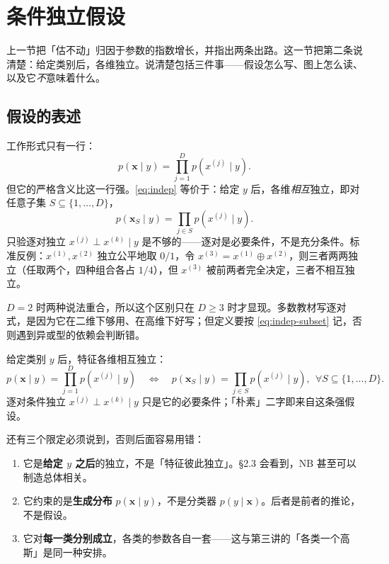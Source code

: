 \documentclass[11pt,a4paper,fontset=windows,zihao=-4]{ctexart}
\newcommand{\bx}{\mathbf{x}}
\begin{document}

\section{条件独立假设}

上一节把「估不动」归因于参数的指数增长，并指出两条出路。这一节把第二条说清楚：给定类别后，各维独立。说清楚包括三件事——假设怎么写、图上怎么读、以及它\emph{不}意味着什么。

\subsection{假设的表述}

工作形式只有一行：
\begin{equation}
  p(\bx\mid y)=\prod_{j=1}^{D}p(x^{(j)}\mid y).
  \label{eq:indep}
\end{equation}
但它的严格含义比这一行强。\eqref{eq:indep} 等价于：给定 $y$ 后，各维\emph{相互}独立，即对任意子集 $S\subseteq\{1,\dots,D\}$，
\begin{equation}
  p(\bx_S\mid y)=\prod_{j\in S}p(x^{(j)}\mid y).
  \label{eq:indep-subset}
\end{equation}
只验逐对独立 $x^{(j)}\perp x^{(k)}\mid y$ 是不够的——逐对是必要条件，不是充分条件。标准反例：$x^{(1)},x^{(2)}$ 独立公平地取 $0/1$，令 $x^{(3)}=x^{(1)}\oplus x^{(2)}$，则三者两两独立（任取两个，四种组合各占 $1/4$），但 $x^{(3)}$ 被前两者完全决定，三者不相互独立。

$D=2$ 时两种说法重合，所以这个区别只在 $D\ge3$ 时才显现。多数教材写逐对式，是因为它在二维下够用、在高维下好写；但定义要按 \eqref{eq:indep-subset} 记，否则遇到异或型的依赖会判断错。

\begin{dfn}[条件独立假设]
给定类别 $y$ 后，特征各维相互独立：
\[
  p(\bx\mid y)=\prod_{j=1}^{D}p(x^{(j)}\mid y)
  \quad\Longleftrightarrow\quad
  p(\bx_S\mid y)=\prod_{j\in S}p(x^{(j)}\mid y),\ \ \forall S\subseteq\{1,\dots,D\}.
\]
逐对条件独立 $x^{(j)}\perp x^{(k)}\mid y$ 只是它的必要条件；「朴素」二字即来自这条强假设。
\end{dfn}

还有三个限定必须说到，否则后面容易用错：

\begin{enumerate}[label=\textcolor{navy}{\bfseries(\arabic*)},leftmargin=2.4em]
  \item 它是\textbf{给定 $y$ 之后}的独立，不是「特征彼此独立」。§2.3 会看到，NB 甚至可以制造总体相关。
  \item 它约束的是\textbf{生成分布} $p(\bx\mid y)$，不是分类器 $p(y\mid\bx)$。后者是前者的推论，不是假设。
  \item 它对\textbf{每一类分别成立}，各类的参数各自一套——这与第三讲的「各类一个高斯」是同一种安排。
\end{enumerate}
\end{document}
